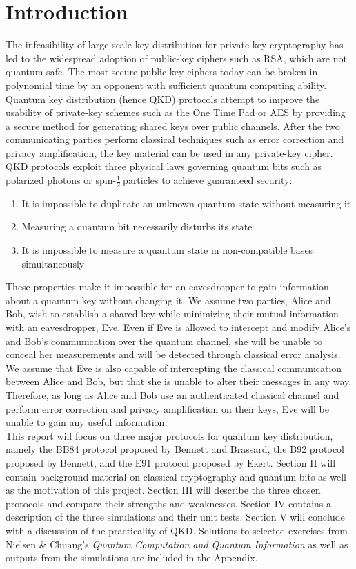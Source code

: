 \documentclass[conference]{IEEEtran}
\begin{document}
\section{Introduction}
The infeasibility of large-scale key distribution for private-key cryptography has led to the widespread adoption of public-key ciphers such as RSA, which are not quantum-safe. The most secure public-key ciphers today can be broken in polynomial time by an opponent with sufficient quantum computing ability. Quantum key distribution (hence QKD) protocols attempt to improve the usability of private-key schemes such as the One Time Pad or AES by providing a secure method for generating shared keys over public channels. After the two communicating parties perform classical techniques such as error correction and privacy amplification, the key material can be used in any private-key cipher.\\

QKD protocols exploit three physical laws governing quantum bits such as polarized photons or spin-\( \frac{1}{2}\ \)particles to achieve guaranteed security:
\begin{enumerate}
\item It is impossible to duplicate an unknown quantum state without measuring it
\item Measuring a quantum bit necessarily disturbs its state
\item It is impossible to measure a quantum state in non-compatible bases simultaneously
\end{enumerate}
These properties make it impossible for an eavesdropper to gain information about a quantum key without changing it. We assume two parties, Alice and Bob, wish to establish a shared key while minimizing their mutual information with an eavesdropper, Eve. Even if Eve is allowed to intercept and modify Alice's and Bob's communication over the quantum channel, she will be unable to conceal her measurements and will be detected through classical error analysis. We assume that Eve is also capable of intercepting the classical communication between Alice and Bob, but that she is unable to alter their messages in any way. Therefore, as long as Alice and Bob use an authenticated classical channel and perform error correction and privacy amplification on their keys, Eve will be unable to gain any useful information.\\

This report will focus on three major protocols for quantum key distribution, namely the BB84 protocol proposed by Bennett and Brassard\cite{BB84}, the B92 protocol proposed by Bennett\cite{B92}, and the E91 protocol proposed by Ekert\cite{E91}. Section II will contain background material on classical cryptography and quantum bits as well as the motivation of this project. Section III will describe the three chosen protocols and compare their strengths and weaknesses. Section IV contains a description of the three simulations and their unit tests. Section V will conclude with a discussion of the practicality of QKD. Solutions to selected exercises from Nielsen \& Chuang's \textit{Quantum Computation and Quantum Information} as well as outputs from the simulations are included in the Appendix.\\
\end{document}

